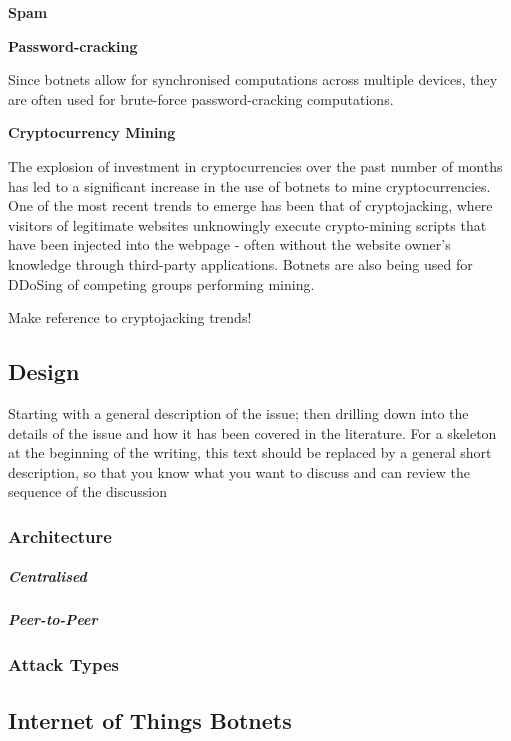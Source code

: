 \bullet \textbf{Spam}

\bullet \textbf{Password-cracking}

Since botnets allow for synchronised computations across multiple devices, they are often used for brute-force password-cracking computations.

\bullet \textbf{Cryptocurrency Mining}

The explosion of investment in cryptocurrencies over the past number of months has led to a significant increase in the use of botnets to mine cryptocurrencies. One of the most recent trends to emerge has been that of cryptojacking, where visitors of legitimate websites unknowingly execute crypto-mining scripts that have been injected into the webpage - often without the website owner's knowledge through third-party applications. Botnets are also being used for DDoSing of competing groups performing mining.

Make reference to cryptojacking trends!

\subsection{Design}

Starting with a general description of the issue; then drilling down into the details of the issue and how it has been covered in the literature. For a skeleton at the beginning of the writing, this text should be replaced by a general short description, so that you know what you want to discuss and can review the sequence of the discussion

\subsubsection{Architecture}
\subparagraph{Centralised}
\subparagraph{Peer-to-Peer}

\subsubsection{Attack Types}


\subsection{Internet of Things Botnets}


